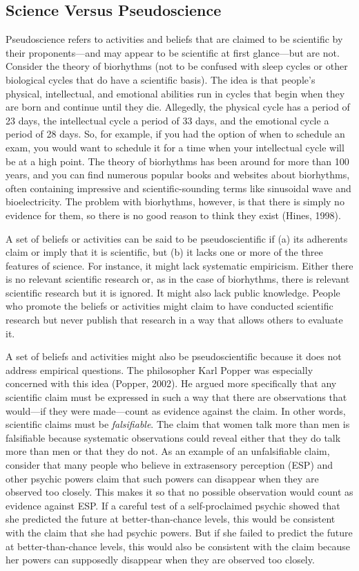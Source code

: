 \documentclass[]{book}
\theoremstyle{definition}
\theoremstyle{definition}
\theoremstyle{remark}
\begin{document}
\subsection{Science Versus
Pseudoscience}\label{science-versus-pseudoscience}

Pseudoscience refers to activities and beliefs that are claimed to be
scientific by their proponents---and may appear to be scientific at
first glance---but are not. Consider the theory of biorhythms (not to be
confused with sleep cycles or other biological cycles that do have a
scientific basis). The idea is that people's physical, intellectual, and
emotional abilities run in cycles that begin when they are born and
continue until they die. Allegedly, the physical cycle has a period of
23 days, the intellectual cycle a period of 33 days, and the emotional
cycle a period of 28 days. So, for example, if you had the option of
when to schedule an exam, you would want to schedule it for a time when
your intellectual cycle will be at a high point. The theory of
biorhythms has been around for more than 100 years, and you can find
numerous popular books and websites about biorhythms, often containing
impressive and scientific-sounding terms like sinusoidal wave and
bioelectricity. The problem with biorhythms, however, is that there is
simply no evidence for them, so there is no good reason to think they
exist (Hines, 1998).

A set of beliefs or activities can be said to be pseudoscientific if (a)
its adherents claim or imply that it is scientific, but (b) it lacks one
or more of the three features of science. For instance, it might lack
systematic empiricism. Either there is no relevant scientific research
or, as in the case of biorhythms, there is relevant scientific research
but it is ignored. It might also lack public knowledge. People who
promote the beliefs or activities might claim to have conducted
scientific research but never publish that research in a way that allows
others to evaluate it.

A set of beliefs and activities might also be pseudoscientific because
it does not address empirical questions. The philosopher Karl Popper was
especially concerned with this idea (Popper, 2002). He argued more
specifically that any scientific claim must be expressed in such a way
that there are observations that would---if they were made---count as
evidence against the claim. In other words, scientific claims must be
\emph{falsifiable}. The claim that women talk more than men is
falsifiable because systematic observations could reveal either that
they do talk more than men or that they do not. As an example of an
unfalsifiable claim, consider that many people who believe in
extrasensory perception (ESP) and other psychic powers claim that such
powers can disappear when they are observed too closely. This makes it
so that no possible observation would count as evidence against ESP. If
a careful test of a self-proclaimed psychic showed that she predicted
the future at better-than-chance levels, this would be consistent with
the claim that she had psychic powers. But if she failed to predict the
future at better-than-chance levels, this would also be consistent with
the claim because her powers can supposedly disappear when they are
observed too closely.
\end{document}
